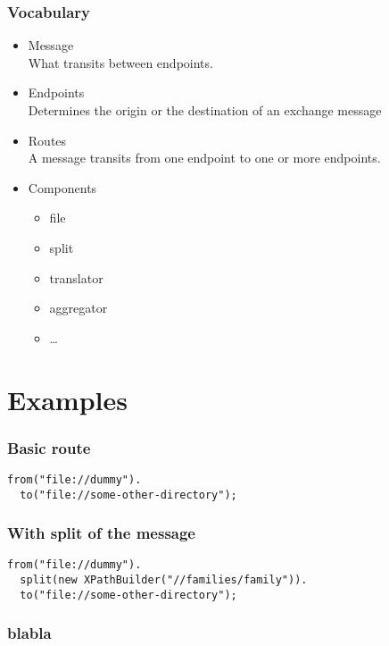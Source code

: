 \documentclass[bigger]{beamer}
\begin{document}
\begin{frame}
\frametitle{Vocabulary}
\label{sec-1-4}
\begin{itemize}

\item Message\\
\label{sec-1-4-1}%
What transits between endpoints.

\item Endpoints\\
\label{sec-1-4-2}%
Determines the origin or the destination of an exchange message

\item Routes\\
\label{sec-1-4-3}%
A message transits from one endpoint to one or more endpoints.

\item Components
\label{sec-1-4-4}%
\begin{itemize}

\item file
\label{sec-1-4-4-1}%

\item split
\label{sec-1-4-4-2}%

\item translator
\label{sec-1-4-4-3}%

\item aggregator
\label{sec-1-4-4-4}%

\item \ldots{}
\label{sec-1-4-4-5}%
\end{itemize} %
\end{itemize} %
\end{frame}
\section{Examples}
\label{sec-2}
\begin{frame}[fragile]
\frametitle{Basic route}
\label{sec-2-1}


\begin{verbatim}
from("file://dummy").
  to("file://some-other-directory");
\end{verbatim}
\end{frame}
\begin{frame}[fragile]
\frametitle{With split of the message}
\label{sec-2-2}


\begin{verbatim}
from("file://dummy").
  split(new XPathBuilder("//families/family")).
  to("file://some-other-directory");
\end{verbatim}
\end{frame}
\begin{frame}
\frametitle{blabla}
\label{sec-2-3}
\end{frame}
\end{document}
